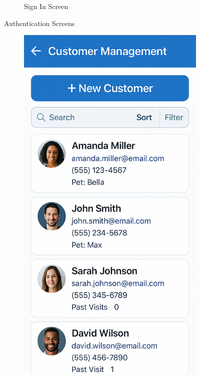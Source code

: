 \documentclass[12pt,a4paper,twoside]{book}
\begin{document}
\begin{figure}[H]
\begin{subfigure}[b]{0.48\textwidth}
        \caption{Sign In Screen}\label{fig:mockup2}
    \end{subfigure}
    \caption{Authentication Screens}\label{fig:auth-screens}
\end{figure}

\begin{figure}[H]
    \centering
    \begin{subfigure}[b]{0.48\textwidth}
        \centering
        \includegraphics[width=\textwidth,height=0.4\textheight,keepaspectratio]{Resources/Mockup Screens/customer_management.png}

\end{subfigure}
\end{figure}
\end{document}

